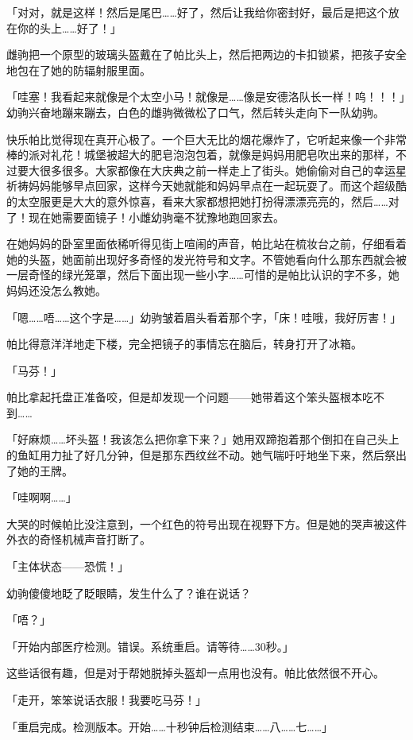 「对对，就是这样！然后是尾巴……好了，然后让我给你密封好，最后是把这个放在你的头上……好了！」

雌驹把一个原型的玻璃头盔戴在了帕比头上，然后把两边的卡扣锁紧，把孩子安全地包在了她的防辐射服里面。

「哇塞！我看起来就像是个太空小马！就像是……像是安德洛队长一样！呜！！！」幼驹兴奋地蹦来蹦去，白色的雌驹微微松了口气，然后转头走向下一队幼驹。

快乐帕比觉得现在真开心极了。一个巨大无比的烟花爆炸了，它听起来像一个非常棒的派对礼花！城堡被超大的肥皂泡泡包着，就像是妈妈用肥皂吹出来的那样，不过要大很多很多。大家都像在大庆典之前一样走上了街头。她偷偷对自己的幸运星祈祷妈妈能够早点回家，这样今天她就能和妈妈早点在一起玩耍了。而这个超级酷的太空服更是大大的意外惊喜，看来大家都想把她打扮得漂漂亮亮的，然后……对了！现在她需要面镜子！小雌幼驹毫不犹豫地跑回家去。

\horizonline

在她妈妈的卧室里面依稀听得见街上喧闹的声音，帕比站在梳妆台之前，仔细看着她的头盔，她面前出现好多奇怪的发光符号和文字。不管她看向什么那东西就会被一层奇怪的绿光笼罩，然后下面出现一些小字……可惜的是帕比认识的字不多，她妈妈还没怎么教她。

「嗯……唔……这个字是……」幼驹皱着眉头看着那个字，「床！哇哦，我好厉害！」

帕比得意洋洋地走下楼，完全把镜子的事情忘在脑后，转身打开了冰箱。

「马芬！」

帕比拿起托盘正准备咬，但是却发现一个问题——她带着这个笨头盔根本吃不到……

「好麻烦……坏头盔！我该怎么把你拿下来？」她用双蹄抱着那个倒扣在自己头上的鱼缸用力扯了好几分钟，但是那东西纹丝不动。她气喘吁吁地坐下来，然后祭出了她的王牌。

「哇啊啊……」

大哭的时候帕比没注意到，一个红色的符号出现在视野下方。但是她的哭声被这件外衣的奇怪机械声音打断了。

「{\mt 主体状态——恐慌！}」

幼驹傻傻地眨了眨眼睛，发生什么了？谁在说话？

「唔？」

「{\mt 开始内部医疗检测。错误。系统重启。请等待……30秒。}」

这些话很有趣，但是对于帮她脱掉头盔却一点用也没有。帕比依然很不开心。

「走开，笨笨说话衣服！我要吃马芬！」

「{\mt 重启完成。检测版本。开始……十秒钟后检测结束……八……七……}」

